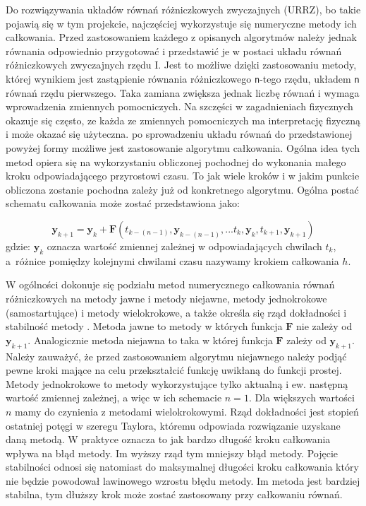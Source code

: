 Do rozwiązywania układów równań różniczkowych zwyczajnych (URRZ), bo takie pojawią się w tym projekcie, najczęściej wykorzystuje się numeryczne metody ich całkowania. Przed zastosowaniem każdego z opisanych algorytmów należy jednak równania odpowiednio przygotować i przedstawić je w postaci układu równań różniczkowych zwyczajnych rzędu I. Jest to możliwe dzięki zastosowaniu metody, której wynikiem jest zastąpienie równania różniczkowego \texttt{n}-tego rzędu, układem \texttt{n} równań rzędu pierwszego. Taka zamiana zwiększa jednak liczbę równań i wymaga wprowadzenia zmiennych pomocniczych. Na szczęści w zagadnieniach fizycznych okazuje się często, ze każda ze zmiennych pomocniczych ma interpretację fizyczną i może okazać się użyteczna. po sprowadzeniu układu równań do przedstawionej powyżej formy możliwe jest zastosowanie algorytmu całkowania. Ogólna idea tych metod opiera się na wykorzystaniu obliczonej pochodnej do wykonania małego kroku odpowiadającego przyrostowi czasu. To jak wiele kroków i w jakim punkcie obliczona zostanie pochodna zależy już od konkretnego algorytmu.
Ogólna postać schematu całkowania może zostać przedstawiona jako:

\[
	\bm{y}_{k+1} = \bm{y}_{k} + \bm{F} \left( t_{k-(n-1)}, \bm{y}_{k-(n-1)}, ... t_{k}, \bm{y}_{k},  t_{k+1}, \bm{y}_{k+1}  \right)
\]
gdzie: $\bm{y}_{k}$ oznacza wartość zmiennej zależnej w odpowiadających chwilach $t_{k}$, a~różnice pomiędzy kolejnymi chwilami czasu nazywamy krokiem całkowania $h$.
 

W ogólności dokonuje się podziału metod numerycznego całkowania równań różniczkowych na metody jawne i metody niejawne, metody jednokrokowe (samostartujące) i metody wielokrokowe, a także określa się rząd dokładności i stabilność metody \cite{met_num_szumbi}. Metoda jawne to metody w których funkcja $\bm{F}$ nie zależy od $\bm{y}_{k+1}$. Analogicznie metoda niejawna to taka w której funkcja $\bm{F}$ zależy od $\bm{y}_{k+1}$. Należy zauważyć, że przed zastosowaniem algorytmu niejawnego należy podjąć pewne kroki mające na celu przekształcić funkcję uwikłaną do funkcji prostej. Metody jednokrokowe to metody wykorzystujące tylko aktualną i ew. następną wartość zmiennej zależnej, a więc w ich schemacie $n = 1$. Dla większych wartości $n$ mamy do czynienia z metodami wielokrokowymi. Rząd dokładności jest stopień ostatniej potęgi w szeregu Taylora, któremu odpowiada rozwiązanie uzyskane daną metodą. W praktyce oznacza to jak bardzo długość kroku całkowania wpływa na błąd metody. Im wyższy rząd tym mniejszy błąd metody. Pojęcie stabilności odnosi się natomiast do maksymalnej długości kroku całkowania który nie będzie powodował lawinowego wzrostu błędu metody. Im metoda jest bardziej stabilna, tym dłuższy krok może zostać zastosowany przy całkowaniu równań.\\

